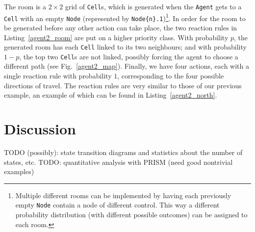\documentclass[runningheads]{llncs}
\begin{document}




The room is a $2 \times 2$ grid of \texttt{Cell}s, which is generated when the
\texttt{Agent} gets to a \texttt{Cell} with an empty \texttt{Node} (represented
by \texttt{Node\{n\}.1})\footnote{Multiple different rooms can be implemented by
having each previously empty \texttt{Node} contain a node of different control.
This way a different probability distribution (with different possible outcomes)
can be assigned to each room.}. In order for the room to be generated before any
other action can take place, the two reaction rules in Listing~\ref{agent2_room}
are put on a higher priority class. With probability $p$, the generated room has
each \texttt{Cell} linked to its two neighbours; and with probability $1-p$, the
top two \texttt{Cell}s are not linked, possibly forcing the agent to choose a
different path (see Fig.~\ref{agent2_map}). Finally, we have four actions, each
with a single reaction rule with probability $1$, corresponding to the four
possible directions of travel. The reaction rules are very similar to those of
our previous example, an example of which can be found in
Listing~\ref{agent2_north}.

\section{Discussion}

TODO (possibly): state transition diagrams and statistics about the number of
states, etc.
TODO: quantitative analysis with PRISM (need good nontrivial examples)
\end{document}
